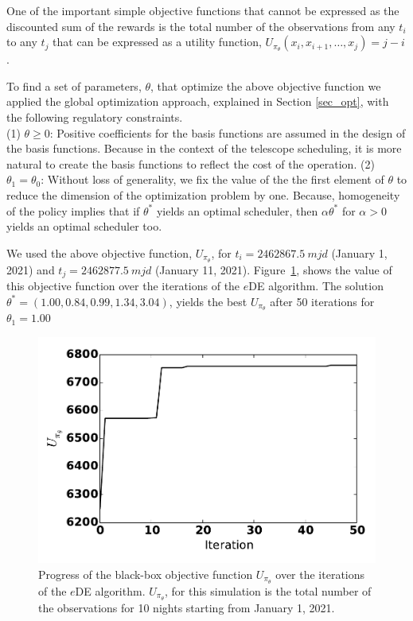 \documentclass[12pt]{aastex62}
\theoremstyle{definition}
\begin{document}
One of the important simple objective functions that cannot be expressed as the discounted sum of the rewards is the total number of the observations from any $t_i$ to any $t_j$ that can be expressed as a utility function, $U_{\pi_{\theta}}(x_i, x_{i+1}, \dots, x_j) = j - i$.

To find a set of parameters, $\theta$, that optimize the above objective function we applied the global optimization approach, explained in Section \ref{sec_opt}, with the following regulatory constraints.\\
(1) $\theta \geq 0$: Positive coefficients for the basis functions are assumed in the design of the basis functions. Because in the context of the telescope scheduling, it is more natural to create the basis functions to reflect the cost of the operation.
(2) $\theta_1 =\theta_0$: Without loss of generality, we fix the value of the the first element of $\theta$ to reduce the dimension of the optimization problem by one. Because, homogeneity of the policy implies that if $\theta^*$ yields an optimal scheduler, then $\alpha \theta^*$ for $\alpha > 0$ yields an optimal scheduler too.

We used the above objective function, $U_{\pi_{\theta}}$, for $t_i = 2462867.5~mjd$ (January 1, 2021) and $t_j = 2462877.5~mjd$ (January 11, 2021). Figure~\ref{fig_eDEObjectiveFunction}, shows the value of this objective function over the iterations of the $e$DE algorithm. The solution $\theta^* = (1.00, 0.84, 0.99,  1.34,  3.04)$, yields the best $U_{\pi_{\theta}}$ after 50 iterations for $\theta_1 = 1.00$

\begin{figure}[h!]
\begin{center}
\includegraphics[width=0.5\linewidth]{Figures/eDEObjectiveFunction.pdf}
\caption{Progress of the black-box objective function $U_{\pi_{\theta}}$ over the iterations of the $e$DE algorithm. $U_{\pi_{\theta}}$, for this simulation is the total number of the observations for 10 nights starting from January 1, 2021.}
\label{fig_eDEObjectiveFunction}
\end{center}
\end{figure}
\end{document}
